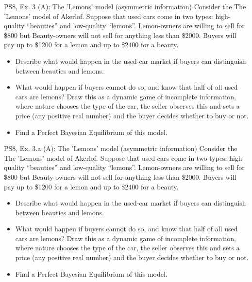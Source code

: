 \begin{frame}{PS8, Ex. 3 (A): The 'Lemons' model (asymmetric information)}
    Consider the The 'Lemons' model of Akerlof. Suppose that used cars come in two types: high-quality “beauties” and low-quality “lemons”. Lemon-owners are willing to sell for \$800 but Beauty-owners will not sell for anything less than \$2000. Buyers will pay up to \$1200 for a lemon and up to \$2400 for a beauty.
    \begin{itemize}
      \item[(a)] Describe what would happen in the used-car market if buyers can distinguish between beauties and lemons.
      \item[(b)] What would happen if buyers cannot do so, and know that half of all used cars are lemons? Draw this as a dynamic game of incomplete information, where nature chooses the type of the car, the seller observes this and sets a price (any positive real number) and the buyer decides whether to buy or not.
      \item[(c)] Find a Perfect Bayesian Equilibrium of this model.
    \end{itemize}
\end{frame}

\begin{frame}{PS8, Ex. 3.a (A): The 'Lemons' model (asymmetric information)}
    Consider the The 'Lemons' model of Akerlof. Suppose that used cars come in two types: high-quality “beauties” and low-quality “lemons”. Lemon-owners are willing to sell for \$800 but Beauty-owners will not sell for anything less than \$2000. Buyers will pay up to \$1200 for a lemon and up to \$2400 for a beauty.
    \begin{itemize}
      \item[(a)] Describe what would happen in the used-car market if buyers can distinguish between beauties and lemons.
      \item[(b)] What would happen if buyers cannot do so, and know that half of all used cars are lemons? Draw this as a dynamic game of incomplete information, where nature chooses the type of the car, the seller observes this and sets a price (any positive real number) and the buyer decides whether to buy or not.
      \item[(c)] Find a Perfect Bayesian Equilibrium of this model.
    \end{itemize}
    \vspace{-8pt}
    \begin{multicols}{2}
      \vfill\null\columnbreak
      \vfill\null
    \end{multicols}
\end{frame}

